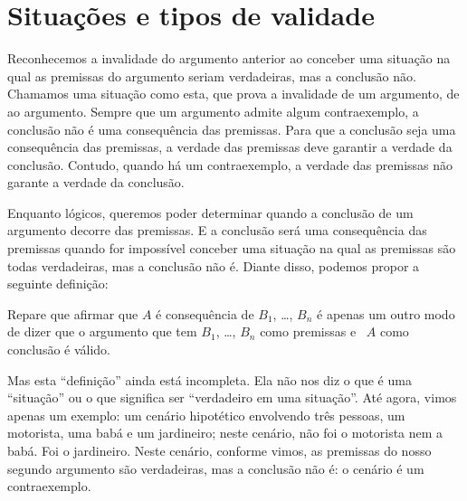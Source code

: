 \section{Situações e tipos de validade}
\label{ss:Validade}

Reconhecemos a invalidade do argumento anterior ao conceber uma situação na qual as premissas do argumento seriam verdadeiras, mas a conclusão não.
Chamamos uma situação como esta, que prova a invalidade de um argumento, de  ao argumento.
Sempre que um argumento admite algum contraexemplo, a conclusão não é uma consequência das premissas.
Para que a conclusão seja uma consequência das premissas, a verdade das premissas deve garantir a verdade da conclusão. Contudo, quando há um contraexemplo, a verdade das premissas não garante a verdade da conclusão.

Enquanto lógicos, queremos poder determinar quando a conclusão de um argumento decorre das premissas.
E a conclusão será uma consequência das premissas quando for impossível conceber uma situação na qual as premissas são todas verdadeiras, mas a conclusão não é.
Diante disso, podemos propor a seguinte definição:


Repare que  afirmar que  $A$ é consequência de $B_1$, \dots, $B_n$ é apenas um outro modo de dizer que o argumento que tem $B_1$, \dots, $B_n$ como premissas e \ $A$ como conclusão é válido.

Mas esta ``definição'' ainda está incompleta.
Ela não nos diz o que é uma ``situação'' ou o que significa ser ``verdadeiro em uma situação''.
Até agora, vimos apenas um exemplo:
um cenário hipotético envolvendo três pessoas, um motorista, uma babá e um jardineiro; neste cenário, não foi o motorista nem a babá. Foi o jardineiro. Neste cenário, conforme vimos, as premissas do nosso segundo argumento são verdadeiras, mas a conclusão não é:
o cenário é um contraexemplo.

